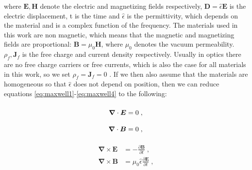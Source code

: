 where $\bm{E}, \bm{H}$ denote the electric and magnetizing fields respectively,  $\bm{D}=\hat{\epsilon} \bm{E}$ is the electric displacement, t is the time and $\hat{\epsilon}$ is the permittivity, which depends on the material and is a complex function of the frequency. The materials used in this work are non magnetic, which means that the magnetic and magnetizing fields are proportional: $\bm{B} = \mu_0 \bm{H}$, where $\mu_0$ denotes the vacuum permeability. $\rho_f, \bm{J}_f$ is the free charge and current density respectively. Usually in optics there are no free charge carriers or free currents, which is also the case for all materials in this work, so we set $\rho_f=\bm{J}_f=0$ \cite{Roth2019Optik}. If we then also assume that the materials are homogeneous so that $\hat{\epsilon}$ does not depend on position, then we can reduce equations \ref{eq:maxwell1}-\ref{eq:maxwell4} to the following:

\noindent\begin{minipage}{.5\linewidth}
\begin{align}
    \bm{\nabla}\cdot \bm{E} &=0\;,\label{eq:maxwell1reduced}
    \vphantom{\frac{\partial\bm{B}}{\partial t}}\\
    \bm{\nabla}\cdot\bm{B} &=0\;,\vphantom{\frac{\partial\bm{B}}{\partial t}}\label{eq:maxwell2reduced}
\end{align}
\end{minipage}%
\begin{minipage}{.5\linewidth}
\begin{align}
    \bm{\nabla}\times\bm{E} &=-\frac{\partial\bm{B}}{\partial t}\;,\label{eq:maxwell3reduced}
    \\
    \bm{\nabla}\times\bm{B} &=\mu_0 \hat{\epsilon} \frac{\partial\bm{E}}{\partial t}\;,\label{eq:maxwell4reduced}
\end{align}
\end{minipage}
\newline

